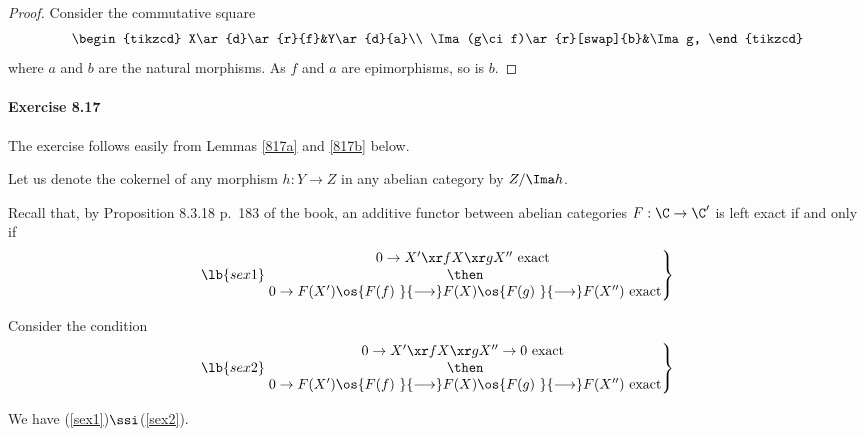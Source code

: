 \documentclass[12pt]{article}
\theoremstyle{remark}
\theoremstyle{definition}
\begin{document}
\begin{proof} 
Consider the commutative square  
$$
\begin{tikzcd}
X\ar{d}\ar{r}{f}&Y\ar{d}{a}\\ 
\Ima(g\ci f)\ar{r}[swap]{b}&\Ima g,
\end{tikzcd}
$$ 
where $a$ and $b$ are the natural morphisms. As $f$ and $a$ are epimorphisms, so is $b$. 
\end{proof} 


\paragraph{Exercise 8.17}

The exercise follows easily from Lemmas \ref{817a} and \ref{817b} below.

Let us denote the cokernel of any morphism $h:Y\to Z$ in any abelian category by $Z/\Ima h$. 

Recall that, by Proposition 8.3.18 p.~183 of the book, an additive functor between abelian categories $F:\C\to\C'$ is left exact if and only if
%
\begin{equation}\lb{sex1}
\left.
\begin{matrix}
0\to X'\xr fX\xr gX''\text{ exact }\\ 
\then\\ 
0\to F(X')\os{F(f)\ }{\longrightarrow}F(X)\os{F(g)\ }{\longrightarrow}F(X'')\text{ exact}
\end{matrix}
\right\}
\end{equation}

Consider the condition
%
\begin{equation}\lb{sex2}
\left.
\begin{matrix}
0\to X'\xr fX\xr gX''\to0\text{ exact }\\ 
\then\\ 
0\to F(X')\os{F(f)\ }{\longrightarrow}F(X)\os{F(g)\ }{\longrightarrow}F(X'')\text{ exact}
\end{matrix}
\right\}
\end{equation}

\begin{lem}
We have (\ref{sex1})$\ssi$(\ref{sex2}). 
\end{lem}
\end{document}

